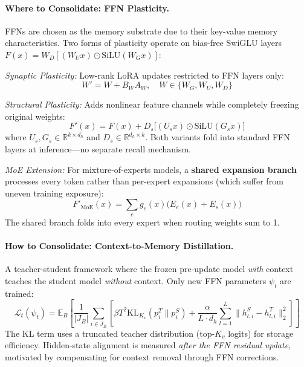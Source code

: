 \documentclass[11pt,a4paper]{article}
\begin{document}
\paragraph{Where to Consolidate: FFN Plasticity.}
FFNs are chosen as the memory substrate due to their key-value memory characteristics. Two forms of plasticity operate on bias-free SwiGLU layers $F(x) = W_D[(W_U x) \odot \text{SiLU}(W_G x)]$:

\emph{Synaptic Plasticity:} Low-rank LoRA updates restricted to FFN layers only:
\begin{equation}
W' = W + B_W A_W, \quad W \in \{W_G, W_U, W_D\}
\end{equation}

\emph{Structural Plasticity:} Adds nonlinear feature channels while completely freezing original weights:
\begin{equation}
F'(x) = F(x) + D_s\bigl[(U_s x) \odot \text{SiLU}(G_s x)\bigr]
\end{equation}
where $U_s, G_s \in \mathbb{R}^{k \times d_h}$ and $D_s \in \mathbb{R}^{d_h \times k}$. Both variants fold into standard FFN layers at inference---no separate recall mechanism.

\emph{MoE Extension:} For mixture-of-experts models, a \textbf{shared expansion branch} processes every token rather than per-expert expansions (which suffer from uneven training exposure):
\begin{equation}
F'_{\text{MoE}}(x) = \textstyle\sum_e g_e(x)\bigl(E_e(x) + E_s(x)\bigr)
\end{equation}
The shared branch folds into every expert when routing weights sum to 1.

\paragraph{How to Consolidate: Context-to-Memory Distillation.}
A teacher-student framework where the frozen pre-update model \emph{with} context teaches the student model \emph{without} context. Only new FFN parameters $\psi_t$ are trained:
\begin{equation}
\mathcal{L}_t(\psi_t) = \mathbb{E}_B\!\left[\frac{1}{|J_B|}\sum_{i \in J_B}\left[\beta T^2 \text{KL}_{K_v}(p_i^T \| p_i^S) + \frac{\alpha}{L \cdot d_h}\sum_{l=1}^{L}\|h_{l,i}^S - h_{l,i}^T\|_2^2\right]\right]
\end{equation}
The KL term uses a truncated teacher distribution (top-$K_v$ logits) for storage efficiency. Hidden-state alignment is measured \emph{after the FFN residual update}, motivated by compensating for context removal through FFN corrections.
\end{document}
